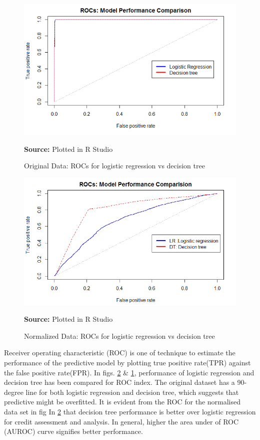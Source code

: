 \begin{center}
\begin{figure}[!htb]
\includegraphics[width=\textwidth]{result0.png}
\centering
\caption{Original Data: ROCs for logistic regression vs decision tree}{\textbf{Source:} Plotted in R Studio}
\label{fig:roc1}
\end{figure}
\end{center}

\begin{center}
\begin{figure}[!htb]
\includegraphics[width=\textwidth]{results1.png}
\centering
\caption{Normalized Data: ROCs for logistic regression vs decision tree}{\textbf{Source:} Plotted in R Studio}
\label{fig:roc}
\end{figure}
\end{center}

Receiver operating characteristic (ROC) is one of technique to estimate the performance of the predictive model by plotting true positive rate(TPR) against the false positive rate(FPR). In figs. \ref{fig:roc} \& \ref{fig:roc1}, performance of logistic regression and decision tree has been compared for ROC index. The original dataset has a 90-degree line for both logistic regression and decision tree, which suggests that predictive might be overfitted. It is evident from the ROC for the normalised data set in fig In \ref{fig:roc} that decision tree performance is better over logistic regression for credit assessment and analysis. In general, higher the area under of ROC (AUROC) curve signifies better performance. \\

